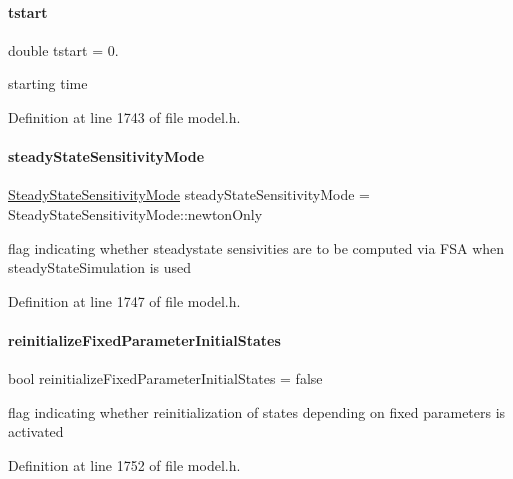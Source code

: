 \mbox{\label{classamici_1_1_model_a514d7e4eb49966fc7d165e0f87fe7f3c}} 
\paragraph{\texorpdfstring{tstart}{tstart}}
{\footnotesize\ttfamily double tstart = 0.\hspace{0.3cm}{\ttfamily [protected]}}

starting time 

Definition at line 1743 of file model.\+h.

\mbox{\label{classamici_1_1_model_a27c46c338afef0ba6da6d0695aa5e844}} 
\paragraph{\texorpdfstring{steady\+State\+Sensitivity\+Mode}{steadyStateSensitivityMode}}
{\footnotesize\ttfamily \mbox{\hyperlink{namespaceamici_a1f7d44f04185d57423d01d47d13470a6}{Steady\+State\+Sensitivity\+Mode}} steady\+State\+Sensitivity\+Mode = Steady\+State\+Sensitivity\+Mode\+::newton\+Only\hspace{0.3cm}{\ttfamily [protected]}}

flag indicating whether steadystate sensivities are to be computed via F\+SA when steady\+State\+Simulation is used 

Definition at line 1747 of file model.\+h.

\mbox{\label{classamici_1_1_model_a48ac1f2997787adc548bd6bfcec857d5}} 
\paragraph{\texorpdfstring{reinitialize\+Fixed\+Parameter\+Initial\+States}{reinitializeFixedParameterInitialStates}}
{\footnotesize\ttfamily bool reinitialize\+Fixed\+Parameter\+Initial\+States = false\hspace{0.3cm}{\ttfamily [protected]}}

flag indicating whether reinitialization of states depending on fixed parameters is activated 

Definition at line 1752 of file model.\+h.

